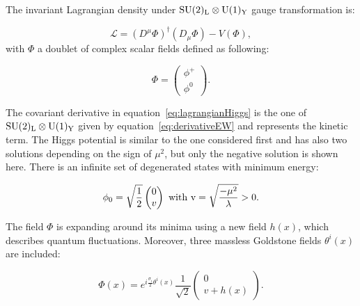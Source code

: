       The invariant Lagrangian density under $\rm{SU}(2)_{\rm{L}} \otimes \rm{U}(1)_{\rm{Y}}$ gauge transformation is:

      \begin{equation}
        \mathcal{L} = \left(D^{\mu} \Phi \right)^{\dagger} \left( D_{\mu} \Phi \right) - V(\Phi),
        \label{eq:lagrangianHiggs}
      \end{equation}    
      with $\Phi$ a doublet of complex scalar fields defined as following:
      
      \begin{equation}
         \Phi = \begin{pmatrix}
                  \phi^{+}\\
                  \phi^{0}
                \end{pmatrix}.
      \end{equation}

      The covariant derivative in equation~\ref{eq:lagrangianHiggs} is the one of $\rm{SU}(2)_{\rm{L}} \otimes \rm{U}(1)_{\rm{Y}}$ given by equation~\ref{eq:derivativeEW} and represents the kinetic term.
      The Higgs potential is similar to the one considered first and has also two solutions depending on the sign of $\mu^2$, but only the negative solution is shown here.
      There is an infinite set of degenerated states with minimum energy:

      \begin{equation}
        \phi_0 = \sqrt{\frac{1}{2}}
        \begin{pmatrix}
          0 \\
          v
        \end{pmatrix}
        ~\rm{with}~v = \sqrt{\frac{- \mu^2}{\lambda}} > 0.
        \label{eq:v2}
      \end{equation}
      
      The field $\Phi$ is expanding around its minima using a new field $h(x)$, which describes quantum fluctuations.
      Moreover, three massless Goldstone fields $\theta^{i}(x)$ are included:

      \begin{equation}
        \Phi(x) = e^{i\frac{\sigma_i}{2}\theta^i(x)} \frac{1}{\sqrt{2}}
                  \begin{pmatrix}
                     0 \\
                     v + h(x)
                   \end{pmatrix}.
        \label{eq:fieldHiggs}
      \end{equation}
       
